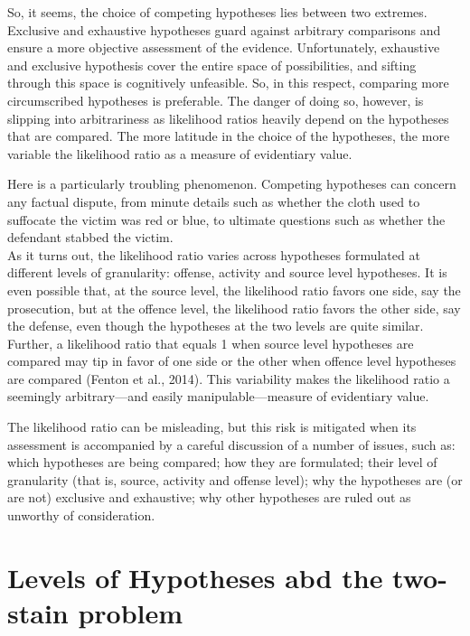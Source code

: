 \documentclass[10pt,dvipsnames,enabledeprecatedfontcommands]{scrartcl}
\begin{document}
So, it seems, the choice of competing hypotheses lies between two
extremes. Exclusive and exhaustive hypotheses guard against arbitrary
comparisons and ensure a more objective assessment of the evidence.
Unfortunately, exhaustive and exclusive hypothesis cover the entire
space of possibilities, and sifting through this space is cognitively
unfeasible. So, in this respect, comparing more circumscribed hypotheses
is preferable. The danger of doing so, however, is slipping into
arbitrariness as likelihood ratios heavily depend on the hypotheses that
are compared. The more latitude in the choice of the hypotheses, the
more variable the likelihood ratio as a measure of evidentiary value.

Here is a particularly troubling phenomenon. Competing hypotheses can
concern any factual dispute, from minute details such as whether the
cloth used to suffocate the victim was red or blue, to ultimate
questions such as whether the defendant stabbed the victim.\\
As it turns out, the likelihood ratio varies across hypotheses
formulated at different levels of granularity: offense, activity and
source level hypotheses. It is even possible that, at the source level,
the likelihood ratio favors one side, say the prosecution, but at the
offence level, the likelihood ratio favors the other side, say the
defense, even though the hypotheses at the two levels are quite similar.
Further, a likelihood ratio that equals 1 when source level hypotheses
are compared may tip in favor of one side or the other when offence
level hypotheses are compared (Fenton et al., 2014). This variability
makes the likelihood ratio a seemingly arbitrary---and easily
manipulable---measure of evidentiary value.

The likelihood ratio can be misleading, but this risk is mitigated when
its assessment is accompanied by a careful discussion of a number of
issues, such as: which hypotheses are being compared; how they are
formulated; their level of granularity (that is, source, activity and
offense level); why the hypotheses are (or are not) exclusive and
exhaustive; why other hypotheses are ruled out as unworthy of
consideration.

\hypertarget{levels-of-hypotheses-abd-the-two-stain-problem}{%
\section{Levels of Hypotheses abd the two-stain
problem}\label{levels-of-hypotheses-abd-the-two-stain-problem}}
\end{document}
